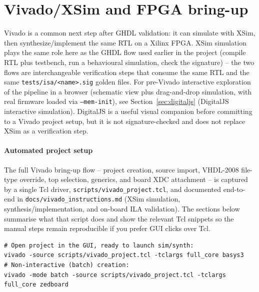 \section{Vivado/XSim and FPGA bring-up}

Vivado is a common next step after GHDL validation: it can simulate with XSim,
then synthesize/implement the same RTL on a Xilinx FPGA. XSim simulation plays
the same role here as the GHDL flow used earlier in the project (compile RTL
plus testbench, run a behavioural simulation, check the signature) -- the two
flows are interchangeable verification steps that consume the same RTL and the
same \texttt{tests/isa/<name>.sig} golden files. For pre-Vivado interactive
exploration of the pipeline in a browser (schematic view plus drag-and-drop
simulation, with real firmware loaded via \texttt{--mem-init}), see
Section~\ref{sec:digitaljs} (DigitalJS interactive simulation). DigitalJS is a
useful visual companion before committing to a Vivado project setup, but it is
not signature-checked and does not replace XSim as a verification step.

\paragraph{Automated project setup}
The full Vivado bring-up flow -- project creation, source import, VHDL-2008
file-type override, top selection, generics, and board XDC attachment -- is
captured by a single Tcl driver, \texttt{scripts/vivado\_project.tcl}, and
documented end-to-end in \texttt{docs/vivado\_instructions.md} (XSim
simulation, synthesis/implementation, and on-board ILA validation). The
sections below summarise what that script does and show the relevant Tcl
snippets so the manual steps remain reproducible if you prefer GUI clicks
over Tcl.

\begin{lstlisting}[style=minrv]
# Open project in the GUI, ready to launch sim/synth:
vivado -source scripts/vivado_project.tcl -tclargs full_core basys3
# Non-interactive (batch) creation:
vivado -mode batch -source scripts/vivado_project.tcl -tclargs full_core zedboard
\end{lstlisting}


